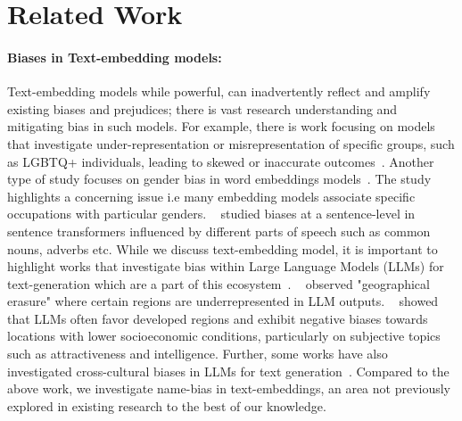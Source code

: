\section{Related Work}
\vspace{-0.1in}
\label{sec:related}
\paragraph{Biases in Text-embedding models:} Text-embedding models while powerful, can inadvertently reflect and amplify existing biases and prejudices; there is vast research understanding and mitigating bias in such models. For example, there is work focusing on models that investigate under-representation or misrepresentation of  specific groups, such as LGBTQ+ individuals, leading to skewed or inaccurate outcomes~\citep{may2019measuring, bolukbasi2016man, cheng2021fairfil}. Another type of study focuses on gender bias in word embeddings models~\citep{rakivnenko2024bias}.  The study highlights a concerning issue i.e many embedding models associate specific occupations with particular genders. ~\citet{nikolaev2023representation} studied biases at a sentence-level in sentence transformers influenced by different parts of speech such as common nouns, adverbs etc.
While we discuss text-embedding model, it is important to highlight works that investigate bias within Large Language Models (LLMs) for text-generation which are a part of this ecosystem~\citep{gallegos2024bias}. ~\citet{schwobel2023geographical} observed "geographical erasure" where certain regions are underrepresented in LLM outputs. ~\citet{manvi2024large}  showed that LLMs often favor developed regions and exhibit negative biases towards locations with lower socioeconomic conditions, particularly on subjective topics such as attractiveness and intelligence. Further, some works have also investigated  cross-cultural biases in LLMs for text generation~\citep{naous2023having, ramezani2023knowledge, cao2023assessing, arora2022probing}. Compared to the above work, we investigate name-bias in text-embeddings, an area not previously explored in existing research to the best of our knowledge. 



